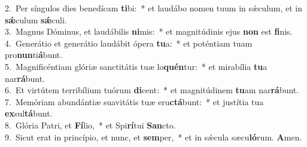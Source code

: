 {2.~}Per síngulos dies benedícam \textbf{ti}bi:~* et laudábo nomen tuum in sǽculum, et in \textbf{sǽ}culum \textbf{sǽ}culi.\\
{3.~}Magnus Dóminus, et laudábilis \textbf{ni}mis:~* et magnitúdinis ejus \textbf{non} est \textbf{fi}nis.\\
{4.~}Generátio et generátio laudábit ópera \textbf{tu}a:~* et poténtiam tuam pro\textbf{nun}ti\textbf{á}bunt.\\
{5.~}Magnificéntiam glóriæ sanctitátis tuæ lo\textbf{quén}tur:~* et mirabília \textbf{tu}a nar\textbf{rá}bunt.\\
{6.~}Et virtútem terribílium tuórum \textbf{di}cent:~* et magnitúdinem \textbf{tu}am nar\textbf{rá}bunt.\\
{7.~}Memóriam abundántiæ suavitátis tuæ eru\textbf{ctá}bunt:~* et justítia tua \textbf{ex}sul\textbf{tá}bunt.\\
{8.~}Glória Patri, et \textbf{Fí}lio,~* et Spi\textbf{rí}tui \textbf{San}cto.\\
{9.~}Sicut erat in princípio, et nunc, et \textbf{sem}per,~* et in sǽcula sæcu\textbf{ló}rum. \textbf{A}men.\\
